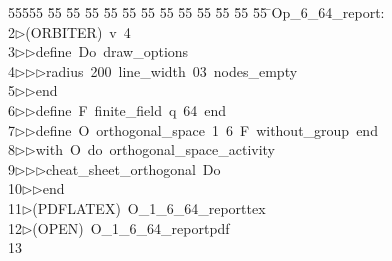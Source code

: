 %
%
\begin{tabbing}
55555 \= 55 \= 55 \= 55 \= 55 \= 55 \= 55 \= 55 \= 55 \= 55 \= 55 \= 55 \= 55 \= \>Op\_6\_64\_report:\\[0pt]
2\>$\triangleright$\>(ORBITER)\ v\ 4\ \\[0pt]
3\>$\triangleright$\>$\triangleright$\>define\ Do\ draw\_options\ \\[0pt]
4\>$\triangleright$\>$\triangleright$\>$\triangleright$\>radius\ 200\ line\_width\ 03\ nodes\_empty\ \\[0pt]
5\>$\triangleright$\>$\triangleright$\>end\ \\[0pt]
6\>$\triangleright$\>$\triangleright$\>define\ F\ finite\_field\ q\ 64\ end\ \\[0pt]
7\>$\triangleright$\>$\triangleright$\>define\ O\ orthogonal\_space\ 1\ 6\ F\ without\_group\ end\ \\[0pt]
8\>$\triangleright$\>$\triangleright$\>with\ O\ do\ orthogonal\_space\_activity\ \\[0pt]
9\>$\triangleright$\>$\triangleright$\>$\triangleright$\>cheat\_sheet\_orthogonal\ Do\ \\[0pt]
10\>$\triangleright$\>$\triangleright$\>end\\[0pt]
11\>$\triangleright$\>(PDFLATEX)\ O\_1\_6\_64\_reporttex\\[0pt]
12\>$\triangleright$\>(OPEN)\ O\_1\_6\_64\_reportpdf\\[0pt]
13\>\end{tabbing}
